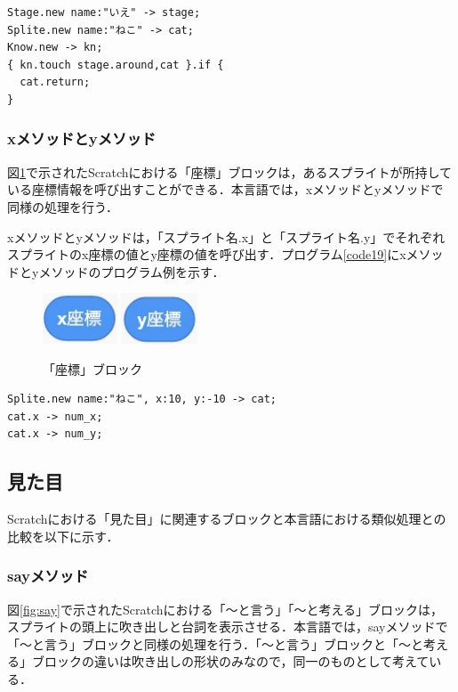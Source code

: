 \documentclass[10pt,a4j]{ltjsarticle}
\begin{document}
\begin{lstlisting}[caption=returnメソッドのプログラム例, label=code18]
Stage.new name:"いえ" -> stage;
Splite.new name:"ねこ" -> cat;
Know.new -> kn;
{ kn.touch stage.around,cat }.if {
  cat.return;
}
\end{lstlisting}

\subsubsection{xメソッドとyメソッド}
図\ref{fig:xy}で示されたScratchにおける「座標」ブロックは，あるスプライトが所持している座標情報を呼び出すことができる．本言語では，xメソッドとyメソッドで同様の処理を行う．

xメソッドとyメソッドは，「スプライト名.x」と「スプライト名.y」でそれぞれスプライトのx座標の値とy座標の値を呼び出す．プログラム\ref{code19}にxメソッドとyメソッドのプログラム例を示す．

\begin{figure}[H]
  \centering
  \includegraphics[height=15mm]{images/x.pdf} 
  \includegraphics[height=15mm]{images/y.pdf} 
  \caption{「座標」ブロック}
  \label{fig:xy}
\end{figure}

\begin{lstlisting}[caption=xメソッドとyメソッドのプログラム例, label=code19]
Splite.new name:"ねこ", x:10, y:-10 -> cat;
cat.x -> num_x;
cat.x -> num_y;
\end{lstlisting}
\subsection{見た目}
Scratchにおける「見た目」に関連するブロックと本言語における類似処理との比較を以下に示す．

\subsubsection{sayメソッド}
図\ref{fig:say}で示されたScratchにおける「〜と言う」「〜と考える」ブロックは，スプライトの頭上に吹き出しと台詞を表示させる．本言語では，sayメソッドで「〜と言う」ブロックと同様の処理を行う．「〜と言う」ブロックと「〜と考える」ブロックの違いは吹き出しの形状のみなので，同一のものとして考えている．
\end{document}
